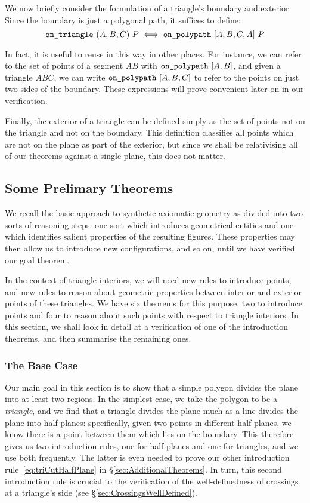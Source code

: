 We now briefly consider the formulation of a triangle's boundary and exterior. Since the boundary is just a polygonal path, it suffices to define:
\begin{equation}\label{eq:onTriangleDef}
\code{on\_triangle}\ (A,B,C)\ P \iff \code{on\_polypath}\ [A,B,C,A]\ P
\end{equation}

In fact, it is useful to reuse  in this way in other places. For instance, we can refer to the set of points of a segment $AB$ with $\texttt{on\_polypath}\ [A,B]$, and given a triangle $ABC$, we can write $\code{on\_polypath}\ [A,B,C]$ to refer to the points on just two sides of the boundary. These expressions will prove convenient later on in our verification.

Finally, the exterior of a triangle can be defined simply as the set of points not on the triangle and not on the boundary. This definition classifies all points which are not on the plane as part of the exterior, but since we shall be relativising all of our theorems against a single plane, this does not matter.

\subsection{Some Prelimary Theorems}
We recall the basic approach to synthetic axiomatic geometry as divided into two sorts of reasoning steps: one sort which introduces geometrical entities and one which identifies salient properties of the resulting figures. These properties may then allow us to introduce new configurations, and so on, until we have verified our goal theorem. 

In the context of triangle interiors, we will need new rules to introduce points, and new rules to reason about geometric properties between interior and exterior points of these triangles. We have six theorems for this purpose, two to introduce points and four to reason about such points with respect to triangle interiors. In this section, we shall look in detail at a verification of one of the introduction theorems, and then summarise the remaining ones.

\subsubsection{The Base Case}
Our main goal in this section is to show that a simple polygon divides the plane into at least two regions. In the simplest case, we take the polygon to be a \emph{triangle}, and we find that a triangle divides the plane much as a line divides the plane into half-planes: specifically, given two points in different half-planes, we know there is a point between them which lies on the boundary. This therefore gives us two introduction rules, one for half-planes and one for triangles, and we use both frequently. The latter is even needed to prove our other introduction rule~\eqref{eq:triCutHalfPlane} in \S\ref{sec:AdditionalTheorems}. In turn, this second introduction rule is crucial to the verification of the well-definedness of crossings at a triangle's side (see \S\ref{sec:CrossingsWellDefined}).
 
